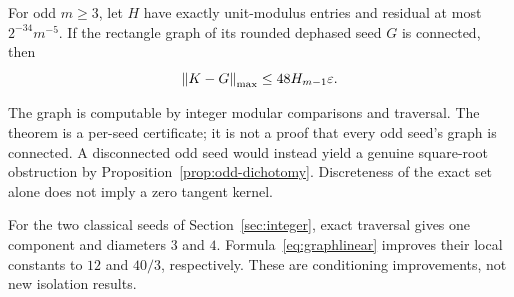 \begin{theorem}\label{thm:polynomial}
For odd $m\ge3$, let $H$ have exactly unit-modulus entries and residual at most $2^{-34}m^{-5}$. If the rectangle graph of its rounded dephased seed $G$ is connected, then
\[
 \left\lVert K-G\right\rVert_{\mathrm{max}}\le48H_{m-1}\varepsilon.
\]
\end{theorem}
The graph is computable by integer modular comparisons and traversal. The theorem is a per-seed certificate; it is not a proof that every odd seed's graph is connected. A disconnected odd seed would instead yield a genuine square-root obstruction by Proposition~\ref{prop:odd-dichotomy}. Discreteness of the exact set alone does not imply a zero tangent kernel.

For the two classical seeds of Section~\ref{sec:integer}, exact traversal gives one component and diameters $3$ and $4$. Formula~\eqref{eq:graphlinear} improves their local constants to $12$ and $40/3$, respectively. These are conditioning improvements, not new isolation results.
